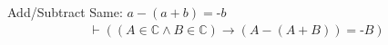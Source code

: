 
\begin{lemma} Add/Subtract Same: $a \minus ( a + b ) =
\textrm{-} b$
\begin{align}
\vdash ( ( A \in \mathbb{C} \wedge B \in \mathbb{C} ) \rightarrow ( A \minus (
    A + B ) ) = \textrm{-} B )\label{eq:bl.npucan}\tag{bl.npucan}
\end{align}
\end{lemma}

